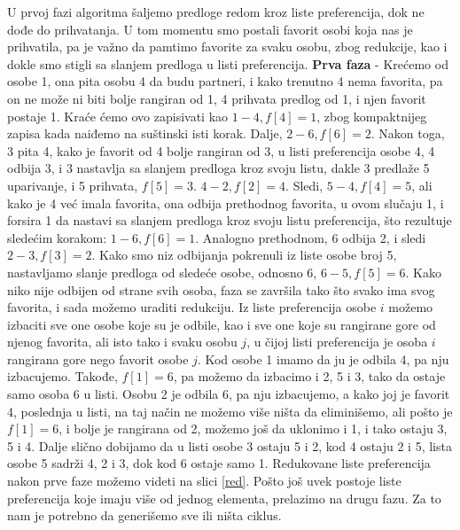 \documentclass[a4paper]{article}
\begin{document}
U prvoj fazi algoritma šaljemo predloge redom kroz liste preferencija, dok ne dođe do prihvatanja. U tom momentu smo postali favorit osobi koja nas je prihvatila, pa je važno da pamtimo favorite za svaku osobu, zbog redukcije, kao i dokle smo stigli sa slanjem predloga u listi preferencija.
\newline
\textbf{Prva faza} - Krećemo od osobe 1, ona pita osobu 4 da budu partneri, i kako trenutno 4 nema favorita, pa on ne može ni biti bolje rangiran od 1, 4 prihvata predlog od 1, i njen favorit postaje 1. Kraće ćemo ovo zapisivati kao $1 - 4, f[4] = 1$, zbog kompaktnijeg zapisa kada naiđemo na suštinski isti korak. Dalje, $2 - 6, f[6] = 2$. Nakon toga, 3 pita 4, kako je favorit od 4 bolje rangiran od 3, u listi preferencija osobe 4, 4 odbija 3, i 3 nastavlja sa slanjem predloga kroz svoju listu, dakle 3 predlaže 5 uparivanje, i 5 prihvata, $f[5] = 3$. $4 - 2, f[2] = 4$. Sledi, $5 - 4, f[4] = 5$, ali kako je 4 već imala favorita, ona odbija prethodnog favorita, u ovom slučaju 1, i forsira 1 da nastavi sa slanjem predloga kroz svoju listu preferencija, što rezultuje sledećim korakom: $1 - 6, f[6] = 1$. Analogno prethodnom, 6 odbija 2, i sledi $2 - 3, f[3] = 2$. Kako smo niz odbijanja pokrenuli iz liste osobe broj 5, nastavljamo slanje predloga od sledeće osobe, odnosno 6, $6 - 5, f[5] = 6$. Kako niko nije odbijen od strane svih osoba, faza se završila tako što svako ima svog favorita, i sada možemo uraditi redukciju. Iz liste preferencija osobe $i$ možemo izbaciti sve one osobe koje su je odbile, kao i sve one koje su rangirane gore od njenog favorita, ali isto tako i svaku osobu $j$, u čijoj listi preferencija je osoba $i$ rangirana gore nego favorit osobe $j$.
\newline
Kod osobe 1 imamo da ju je odbila 4, pa nju izbacujemo. Takođe, $f[1] = 6$, pa možemo da izbacimo i 2, 5 i 3, tako da ostaje samo osoba 6 u listi.
\newline
Osobu 2 je odbila 6, pa nju izbacujemo, a kako joj je favorit 4, poslednja u listi, na taj način ne možemo više ništa da eliminišemo, ali pošto je $f[1] = 6$, i bolje je rangirana od 2, možemo još da uklonimo i 1, i tako ostaju 3, 5 i 4.
\newline
Dalje slično dobijamo da u listi osobe 3 ostaju 5 i 2, kod 4 ostaju 2 i 5, lista osobe 5 sadrži 4, 2 i 3, dok kod 6 ostaje samo 1.
\newline
Redukovane liste preferencija nakon prve faze možemo videti na slici \ref{red}.
Pošto još uvek postoje liste preferencija koje imaju više od jednog elementa, prelazimo na drugu fazu. Za to nam je potrebno da generišemo sve ili ništa ciklus.
\end{document}
